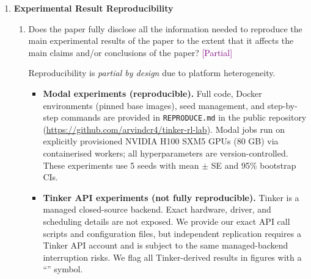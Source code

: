 \documentclass{article}
\newcommand{\answerPartial}[1][]{\textcolor{purple}{[Partial] #1}}
\begin{document}
\begin{enumerate}
\item {\bf Experimental Result Reproducibility}
    \begin{enumerate}
        \item Does the paper fully disclose all the information needed to
              reproduce the main experimental results of the paper to the
              extent that it affects the main claims and/or conclusions of
              the paper?
        \answerPartial{Reproducibility is \emph{partial by design} due to
        platform heterogeneity.
        \begin{itemize}
          \item \textbf{Modal experiments (reproducible).}  Full code,
                Docker environments (pinned base images), seed management,
                and step-by-step commands are provided in
                \texttt{REPRODUCE.md} in the public repository
                (\url{https://github.com/arvindcr4/tinker-rl-lab}).
                Modal jobs run on explicitly provisioned NVIDIA H100 SXM5
                GPUs (80 GB) via containerised workers; all hyperparameters
                are version-controlled.  These experiments use 5 seeds with
                mean $\pm$ SE and 95\% bootstrap CIs.
          \item \textbf{Tinker API experiments (not fully reproducible).}
                Tinker is a managed closed-source backend.  Exact hardware,
                driver, and scheduling details are not exposed.  We provide our exact API call scripts and
                configuration files, but independent replication requires a
                Tinker API account and is subject to the same managed-backend
                interruption risks.  We flag all Tinker-derived results
                in figures with a ``\dag{}'' symbol.
        \end{itemize}}
    \end{enumerate}


\end{enumerate}
\end{document}
